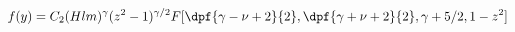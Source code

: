 \begin{equation}
f(y)=C_2 (Hlm)^{\gamma}(z^2 -1)^{\gamma/2}F[\dpf{\gamma-\nu+2}{2},\dpf{\gamma+\nu+2}{2},\gamma+5/2,1-z^2]
\end{equation}

